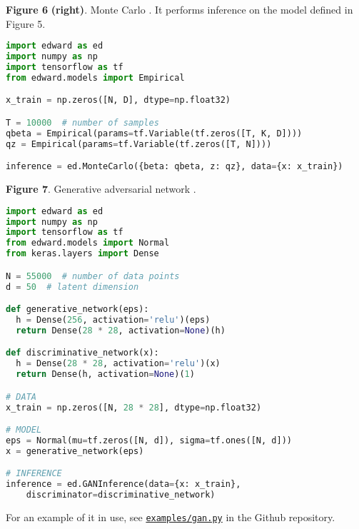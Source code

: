 \textbf{Figure 6} \textbf{(right)}. Monte Carlo \citep{robert1999monte}.
It performs inference on the model defined in Figure 5.
\begin{lstlisting}[language=python]
import edward as ed
import numpy as np
import tensorflow as tf
from edward.models import Empirical

x_train = np.zeros([N, D], dtype=np.float32)

T = 10000  # number of samples
qbeta = Empirical(params=tf.Variable(tf.zeros([T, K, D])))
qz = Empirical(params=tf.Variable(tf.zeros([T, N])))

inference = ed.MonteCarlo({beta: qbeta, z: qz}, data={x: x_train})
\end{lstlisting}

\textbf{Figure 7}. Generative adversarial network
\citep{goodfellow2014generative}.
\begin{lstlisting}[language=python]
import edward as ed
import numpy as np
import tensorflow as tf
from edward.models import Normal
from keras.layers import Dense

N = 55000  # number of data points
d = 50  # latent dimension

def generative_network(eps):
  h = Dense(256, activation='relu')(eps)
  return Dense(28 * 28, activation=None)(h)

def discriminative_network(x):
  h = Dense(28 * 28, activation='relu')(x)
  return Dense(h, activation=None)(1)

# DATA
x_train = np.zeros([N, 28 * 28], dtype=np.float32)

# MODEL
eps = Normal(mu=tf.zeros([N, d]), sigma=tf.ones([N, d]))
x = generative_network(eps)

# INFERENCE
inference = ed.GANInference(data={x: x_train},
    discriminator=discriminative_network)
\end{lstlisting}
For an example of it in use, see
\href{https://github.com/blei-lab/edward/blob/master/examples/gan.py}{\texttt{examples/gan.py}}
in the Github repository.

